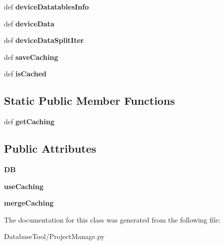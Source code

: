 \begin{DoxyCompactItemize}
def {\bfseries device\+Datatables\+Info}
\item 
\mbox{\label{classMIS_1_1DatabaseTool_1_1ProjectManage_1_1Cormis__DataReader_a35aa0d6e5a242a199918ee80a7c2cb4d}} 
def {\bfseries device\+Data}
\item 
\mbox{\label{classMIS_1_1DatabaseTool_1_1ProjectManage_1_1Cormis__DataReader_ae713a502cd47956b30e9bb08a66a940d}} 
def {\bfseries device\+Data\+Split\+Iter}
\item 
\mbox{\label{classMIS_1_1DatabaseTool_1_1ProjectManage_1_1Cormis__DataReader_ae3f4dc4263b4687f065e731f2fc1e92d}} 
def {\bfseries save\+Caching}
\item 
\mbox{\label{classMIS_1_1DatabaseTool_1_1ProjectManage_1_1Cormis__DataReader_a87e48b3341d535be6287314181a460fd}} 
def {\bfseries is\+Cached}
\end{DoxyCompactItemize}
\subsection*{Static Public Member Functions}
\begin{DoxyCompactItemize}
\item 
\mbox{\label{classMIS_1_1DatabaseTool_1_1ProjectManage_1_1Cormis__DataReader_a4842e7623feb028a87cecdd43e2a3f23}} 
def {\bfseries get\+Caching}
\end{DoxyCompactItemize}
\subsection*{Public Attributes}
\begin{DoxyCompactItemize}
\item 
\mbox{\label{classMIS_1_1DatabaseTool_1_1ProjectManage_1_1Cormis__DataReader_accb4091736bac6d410e1233500127378}} 
{\bfseries DB}
\item 
\mbox{\label{classMIS_1_1DatabaseTool_1_1ProjectManage_1_1Cormis__DataReader_a64e6dda38ea860ea3b24fda1c7ea9b89}} 
{\bfseries use\+Caching}
\item 
\mbox{\label{classMIS_1_1DatabaseTool_1_1ProjectManage_1_1Cormis__DataReader_a27d6f58965f58f4b0d58f85612b378fc}} 
{\bfseries merge\+Caching}
\end{DoxyCompactItemize}


The documentation for this class was generated from the following file\+:\begin{DoxyCompactItemize}
\item 
Database\+Tool/Project\+Manage.\+py\end{DoxyCompactItemize}

